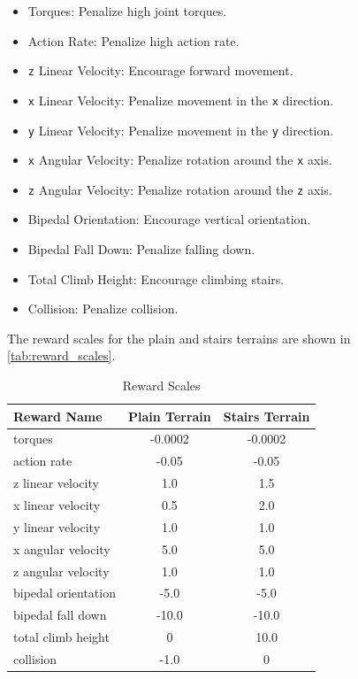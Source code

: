 \documentclass{article} %
\begin{document}
\begin{itemize}[itemsep=-0.3em]
   \item Torques: Penalize high joint torques.
   \item Action Rate: Penalize high action rate.
   \item \texttt{z} Linear Velocity: Encourage forward movement.
   \item \texttt{x} Linear Velocity: Penalize movement in the \texttt{x} direction.
   \item \texttt{y} Linear Velocity: Penalize movement in the \texttt{y} direction.
   \item \texttt{x} Angular Velocity: Penalize rotation around the \texttt{x} axis.
   \item \texttt{z} Angular Velocity: Penalize rotation around the \texttt{z} axis.
   \item Bipedal Orientation: Encourage vertical orientation.
   \item Bipedal Fall Down: Penalize falling down.
   \item Total Climb Height: Encourage climbing stairs.
   \item Collision: Penalize collision.
\end{itemize}

The reward scales for the plain and stairs terrains are shown in \autoref{tab:reward_scales}.

\begin{table}[H]
   \centering
   \begin{tabular}{@{}lcc@{}}
   \toprule
   Reward Name       & Plain Terrain   & Stairs Terrain \\ \midrule
   torques           &-0.0002          & -0.0002 \\
   action rate       & -0.05           & -0.05 \\
   z linear velocity & 1.0             & 1.5 \\
   x linear velocity & 0.5             & 2.0  \\
   y linear velocity & 1.0             & 1.0  \\
   x angular velocity & 5.0            & 5.0  \\
   z angular velocity & 1.0            & 1.0  \\
   bipedal orientation & -5.0          & -5.0 \\
   bipedal fall down   & -10.0         & -10.0 \\
   total climb height &  0             & 10.0 \\
   collision         & -1.0            & 0 \\
   \bottomrule
   \end{tabular}
\vspace{-0.5em}
\caption{Reward Scales}
\label{tab:reward_scales}
\end{table}
\end{document}
